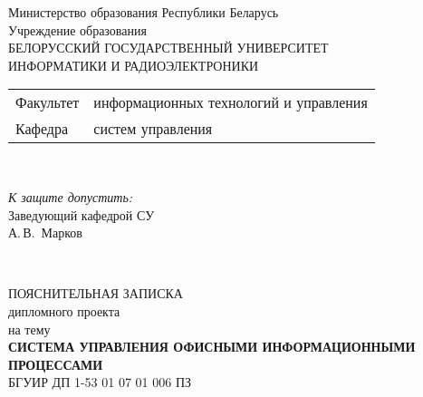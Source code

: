 \begin{titlepage}
  \begin{center}
    Министерство образования Республики Беларусь\\[1em]
    Учреждение образования\\
    БЕЛОРУССКИЙ ГОСУДАРСТВЕННЫЙ УНИВЕРСИТЕТ \\
    ИНФОРМАТИКИ И РАДИОЭЛЕКТРОНИКИ\\[1em]

    \begin{minipage}{\textwidth}
      \begin{flushleft}
        \begin{tabular}{ l l }
          Факультет & информационных технологий и управления\\
          Кафедра   & систем управления
        \end{tabular}
      \end{flushleft}
    \end{minipage}\\[1em]

    \begin{flushright}
      \begin{minipage}{0.4\textwidth}
        \textit{К защите допустить:}\\[0.8em]
        Заведующий кафедрой СУ\\[0.45em]
        \underline{\hspace*{2.8cm}} А.\,В.~Марков
      \end{minipage}\\[2.2em]
    \end{flushright}

    {ПОЯСНИТЕЛЬНАЯ ЗАПИСКА}\\
    {дипломного проекта}\\
    {на тему}\\[1em]
    \textbf{\large СИСТЕМА УПРАВЛЕНИЯ ОФИСНЫМИ ИНФОРМАЦИОННЫМИ ПРОЦЕССАМИ}\\[1em]


    {БГУИР ДП 1-53 01 07 01 006 ПЗ}\\[2em]
    

\end{center}
\end{titlepage}

